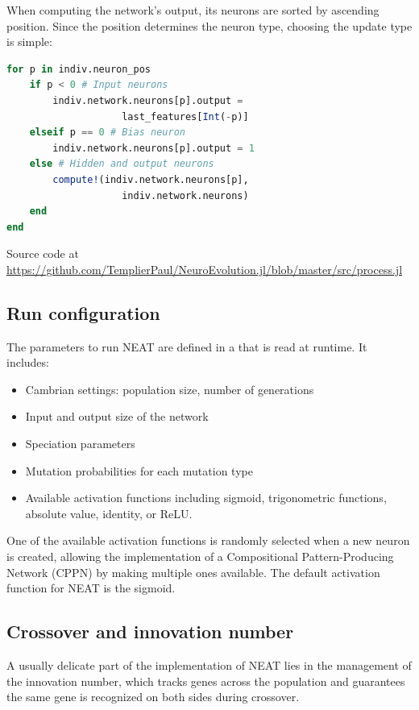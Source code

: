 When computing the network's output, its neurons are sorted by ascending position. Since the position determines the neuron type, choosing the update type is simple:

\begin{minipage}{\linewidth}
\begin{lstlisting}[language=Julia, caption=NEAT network processing]
for p in indiv.neuron_pos
    if p < 0 # Input neurons
        indiv.network.neurons[p].output = 
                    last_features[Int(-p)]
    elseif p == 0 # Bias neuron
        indiv.network.neurons[p].output = 1
    else # Hidden and output neurons
        compute!(indiv.network.neurons[p], 
                    indiv.network.neurons)
    end
end
\end{lstlisting}
Source code at \url{https://github.com/TemplierPaul/NeuroEvolution.jl/blob/master/src/process.jl}\\
\end{minipage}

\subsection{Run configuration}

The parameters to run NEAT are defined in a   that is read at runtime. It includes:

\begin{itemize}
    \item Cambrian settings: population size, number of generations
    \item Input and output size of the network
    \item Speciation parameters
    \item Mutation probabilities for each mutation type
    \item Available activation functions including sigmoid, trigonometric functions, absolute value, identity, or ReLU. 
\end{itemize}

One of the available activation functions is randomly selected when a new neuron is created, allowing the implementation of a Compositional Pattern-Producing Network (CPPN) by making multiple ones available. The default activation function for NEAT is the sigmoid. 

\subsection{Crossover and innovation number}
A usually delicate part of the implementation of NEAT lies in the management of the innovation number, which tracks genes across the population and guarantees the same gene is recognized on both sides during crossover.

